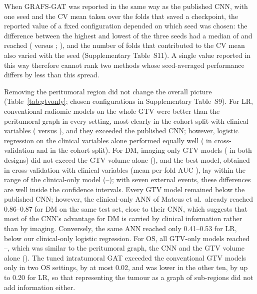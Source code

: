 \documentclass[11pt,a4paper]{article}
\newcommand{\method}{GRAFS-GAT}
\begin{document}
When \method{} was reported in the same way as the published CNN, with one seed and the CV mean taken over the folds that saved a checkpoint, the reported value of a fixed configuration depended on which seed was chosen: the difference between the highest and lowest of the three seeds had a median of \msSpreadMed{} and reached \msSpreadMax{} (\msSpreadMaxLo{} versus \msSpreadMaxHi{}; \msSpreadMaxWhat), and the number of folds that contributed to the CV mean also varied with the seed (Supplementary Table~S11). A single value reported in this way therefore cannot rank two methods whose seed-averaged performance differs by less than this spread.

Removing the peritumoral region did not change the overall picture (Table~\ref{tab:gtvonly}; chosen configurations in Supplementary Table~S9). For LR, conventional radiomic models on the whole GTV were better than the peritumoral graph in every setting, most clearly in the cohort split with clinical variables (\gtvClsLRCohClin{} versus \aucLRCohClinChosen), and they exceeded the published CNN; however, logistic regression on the clinical variables alone performed equally well (\gtvRefLRCVClin{} in cross-validation and \gtvRefLRCohClin{} in the cohort split). For DM, imaging-only GTV models (\gtvClsDMCVImg{} in both designs) did not exceed the GTV volume alone (\gtvRefDMCVImg), and the best model, obtained in cross-validation with clinical variables (mean per-fold AUC \gtvClsDMCVClin), lay within the range of the clinical-only model (\gtvRefDMCVClin--\gtvRefDMCohClin); with seven external events, these differences are well inside the confidence intervals. Every GTV model remained below the published CNN; however, the clinical-only ANN of Mateus et al.\ already reached 0.86--0.87 for DM on the same test set, close to their CNN, which suggests that most of the CNN's advantage for DM is carried by clinical information rather than by imaging. Conversely, the same ANN reached only 0.41--0.53 for LR, below our clinical-only logistic regression. For OS, all GTV-only models reached \gtvClsOSCVImg--\gtvClsOSCVClin, which was similar to the peritumoral graph, the CNN and the GTV volume alone (\gtvRefOSCVImg). The tuned intratumoral GAT exceeded the conventional GTV models only in two OS settings, by at most 0.02, and was lower in the other ten, by up to 0.20 for LR, so that representing the tumour as a graph of sub-regions did not add information either.
\end{document}
